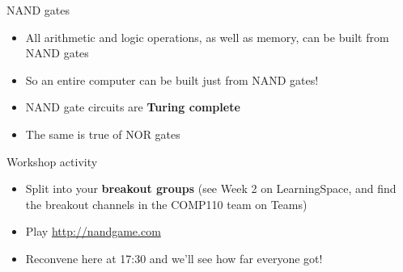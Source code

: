 \begin{frame}{NAND gates}
    \begin{itemize}
        \pause\item All arithmetic and logic operations, as well as memory, can be built from NAND gates
        \pause\item So an entire computer can be built just from NAND gates!
        \pause\item NAND gate circuits are \textbf{Turing complete}
        \pause\item The same is true of NOR gates
    \end{itemize}
\end{frame}

\begin{frame}{Workshop activity}
	\begin{itemize}
		\item Split into your \textbf{breakout groups} (see Week 2 on LearningSpace, and find the breakout channels in the COMP110 team on Teams)
		\item Play \url{http://nandgame.com}
		\item Reconvene here at 17:30 and we'll see how far everyone got!
	\end{itemize}
\end{frame}
